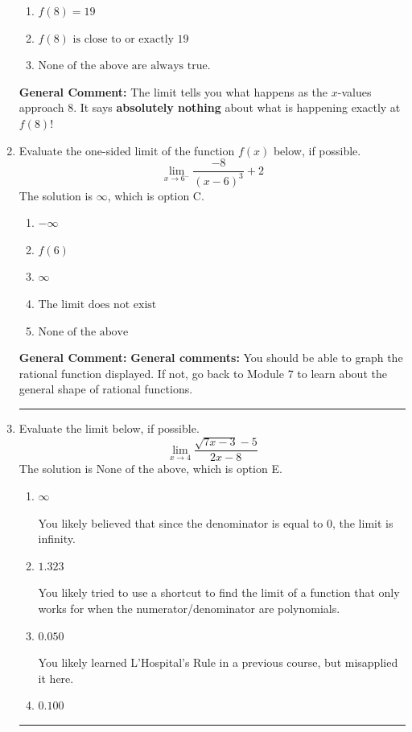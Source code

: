 \documentclass{extbook}[14pt]
\newcommand{\litem}[1]{\item #1

\rule{\textwidth}{0.4pt}}
\begin{document}
\begin{enumerate}
{\begin{enumerate}[label=\Alph*.]
\item \( f(8) = 19 \)


\item \( f(8) \text{ is close to or exactly } 19 \)


\item \( \text{None of the above are always true.} \)


\end{enumerate}

\textbf{General Comment:} The limit tells you what happens as the $x$-values approach $8$. It says \textbf{absolutely nothing} about what is happening exactly at $f(8)$!
}
\litem{
Evaluate the one-sided limit of the function $f(x)$ below, if possible.
\[ \lim_{x \rightarrow 6^-} \frac{-8}{(x-6)^3}+2 \]The solution is \( \infty \), which is option C.\begin{enumerate}[label=\Alph*.]
\item \( -\infty \)


\item \( f(6) \)


\item \( \infty \)


\item \( \text{The limit does not exist} \)


\item \( \text{None of the above} \)


\end{enumerate}

\textbf{General Comment:} \textbf{General comments:} You should be able to graph the rational function displayed. If not, go back to Module 7 to learn about the general shape of rational functions.
}
\litem{
Evaluate the limit below, if possible.
\[ \lim_{x \rightarrow 4} \frac{\sqrt{7x - 3} - 5}{2x - 8} \]The solution is \( \text{None of the above} \), which is option E.\begin{enumerate}[label=\Alph*.]
\item \( \infty \)

You likely believed that since the denominator is equal to 0, the limit is infinity.
\item \( 1.323 \)

You likely tried to use a shortcut to find the limit of a function that only works for when the numerator/denominator are polynomials.
\item \( 0.050 \)

You likely learned L'Hospital's Rule in a previous course, but misapplied it here.
\item \( 0.100 \)


\end{enumerate}}
\end{enumerate}
\end{document}

